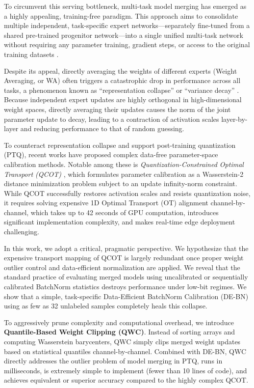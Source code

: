 \documentclass{article}
\theoremstyle{plain}
\theoremstyle{definition}
\theoremstyle{remark}
\begin{document}
To circumvent this serving bottleneck, multi-task model merging has emerged as a highly appealing, training-free paradigm. This approach aims to consolidate multiple independent, task-specific expert networks—separately fine-tuned from a shared pre-trained progenitor network—into a single unified multi-task network without requiring any parameter training, gradient steps, or access to the original training datasets \cite{wortsman22, ilharco23}.

Despite its appeal, directly averaging the weights of different experts (Weight Averaging, or WA) often triggers a catastrophic drop in performance across all tasks, a phenomenon known as ``representation collapse'' or ``variance decay'' \cite{jordan23}. Because independent expert updates are highly orthogonal in high-dimensional weight spaces, directly averaging their updates causes the norm of the joint parameter update to decay, leading to a contraction of activation scales layer-by-layer and reducing performance to that of random guessing.

To counteract representation collapse and support post-training quantization (PTQ), recent works have proposed complex data-free parameter-space calibration methods. Notable among these is \textit{Quantization-Constrained Optimal Transport (QCOT)} \cite{paper9}, which formulates parameter calibration as a Wasserstein-2 distance minimization problem subject to an update infinity-norm constraint. While QCOT successfully restores activation scales and resists quantization noise, it requires solving expensive 1D Optimal Transport (OT) alignment channel-by-channel, which takes up to 42 seconds of GPU computation, introduces significant implementation complexity, and makes real-time edge deployment challenging.

In this work, we adopt a critical, pragmatic perspective. We hypothesize that the expensive transport mapping of QCOT is largely redundant once proper weight outlier control and data-efficient normalization are applied. We reveal that the standard practice of evaluating merged models using uncalibrated or sequentially calibrated BatchNorm statistics destroys performance under low-bit regimes. We show that a simple, task-specific Data-Efficient BatchNorm Calibration (DE-BN) using as few as 32 unlabeled samples completely heals this collapse.

To aggressively prune complexity and computational overhead, we introduce \textbf{Quantile-Based Weight Clipping (QWC)}. Instead of sorting arrays and computing Wasserstein barycenters, QWC simply clips merged weight updates based on statistical quantiles channel-by-channel. Combined with DE-BN, QWC directly addresses the outlier problem of model merging in PTQ, runs in milliseconds, is extremely simple to implement (fewer than 10 lines of code), and achieves equivalent or superior accuracy compared to the highly complex QCOT.
\end{document}
